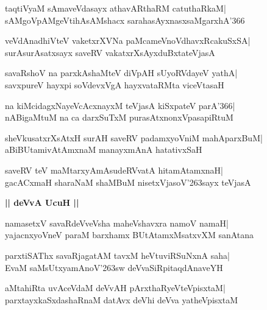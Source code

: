 \documentclass[twoside,12pt,openright]{book}
\def\S{\char'263}
\newcounter{shloka}[chapter]
\def\uvaca#1{\centerline{{\large\textbf{#1}}}}
\begin{document}
\begin{shloka}%
taqtiVyaM sAmaveVdasayx athavARthaRM catuthaRkaM|\\
sAMgoVpAMgeVtihAsAMshacx sarahasAyxnasxsaMgarxhA\char'366
\end{shloka}

\begin{shloka}%
veVdAnadhiVteV vaketxrXVNa paMcameVnoVdhavxRcakuSxSA|\\
surAsurAsatxsayx saveRV vakatxrXsAyxduBxtateVjasA
\end{shloka}

\begin{shloka}%
savaRshoV na parxkAshaMteV diVpAH sUyoRVdayeV yathA|\\
savxpureV hayxpi soVdevxVgA hayxvataRMta viceVtasaH
\end{shloka}

\begin{shloka}%
na kiMcidagxNayeVcAcxnayxM teVjasA kiSxpateV parA\char'366|\\
nABigaMtuM na ca darxSuTxM purasAtxnonxVpasapiRtuM
\end{shloka}

\begin{shloka}%
sheVkusatxrXsAtxH surAH saveRV padamxyoVniM mahAparxBuM|\\
aBiBUtamivAtAmxnaM manayxmAnA hatativxSaH
\end{shloka}

\begin{shloka}%
saveRV teV maMtarxyAmAsudeRVvatA hitamAtamxnaH|\\
gacACxmaH sharaNaM shaMBuM nisetxVjasoV\S sayx teVjasA
\end{shloka}

\uvaca{|| deVvA UcuH ||}
\begin{shloka}%
namasetxV savaRdeVveVsha maheVshavxra namoV namaH|\\
yajacnxyoVneV paraM barxhamx BUtAtamxMsatxvXM sanAtana
\end{shloka}

\begin{shloka}%
parxtiSAThx savaRjagatAM tavxM heVtuviRSuNxnA saha|\\
EvaM saMsUtxyamAnoV\S sw deVvaSiRpitaqdAnaveYH
\end{shloka}

\begin{shloka}%
aMtahiRta uvAceVdaM deVvAH pArxthaRyeVteVpisxtaM|\\
parxtayxkaSxdashaRnaM datAvx deVhi deVva yatheVpisxtaM
\end{shloka}
\end{document}
